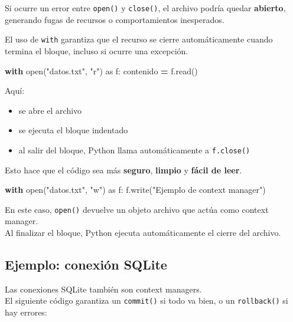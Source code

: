 \documentclass[
]{book}
\newenvironment{Shaded}{\begin{snugshade}}{\end{snugshade}}
\newcommand{\BuiltInTok}[1]{#1}
\newcommand{\ControlFlowTok}[1]{\textcolor[rgb]{0.13,0.29,0.53}{\textbf{#1}}}
\newcommand{\ImportTok}[1]{#1}
\newcommand{\NormalTok}[1]{#1}
\newcommand{\OperatorTok}[1]{\textcolor[rgb]{0.81,0.36,0.00}{\textbf{#1}}}
\newcommand{\StringTok}[1]{\textcolor[rgb]{0.31,0.60,0.02}{#1}}
\providecommand{\tightlist}{%
  \setlength{\itemsep}{0pt}\setlength{\parskip}{0pt}}
\theoremstyle{break}
\theoremstyle{nonumberplain}
\begin{document}
Si ocurre un error entre \texttt{open()} y \texttt{close()}, el archivo podría quedar \textbf{abierto}, generando fugas de recursos o comportamientos inesperados.

El uso de \texttt{with} garantiza que el recurso se cierre automáticamente cuando termina el bloque, incluso si ocurre una excepción.

\begin{Shaded}
\begin{Highlighting}[]
\ControlFlowTok{with} \BuiltInTok{open}\NormalTok{(}\StringTok{"datos.txt"}\NormalTok{, }\StringTok{"r"}\NormalTok{) }\ImportTok{as}\NormalTok{ f:}
\NormalTok{    contenido }\OperatorTok{=}\NormalTok{ f.read()}
\end{Highlighting}
\end{Shaded}

Aquí:

\begin{itemize}
\tightlist
\item
  se abre el archivo
\item
  se ejecuta el bloque indentado
\item
  al salir del bloque, Python llama automáticamente a \texttt{f.close()}
\end{itemize}

Esto hace que el código sea más \textbf{seguro}, \textbf{limpio} y \textbf{fácil de leer}.

\begin{Shaded}
\begin{Highlighting}[]
\ControlFlowTok{with} \BuiltInTok{open}\NormalTok{(}\StringTok{"datos.txt"}\NormalTok{, }\StringTok{"w"}\NormalTok{) }\ImportTok{as}\NormalTok{ f:}
\NormalTok{    f.write(}\StringTok{"Ejemplo de context manager"}\NormalTok{)}
\end{Highlighting}
\end{Shaded}

En este caso, \texttt{open()} devuelve un objeto archivo que actúa como context manager.\\
Al finalizar el bloque, Python ejecuta automáticamente el cierre del archivo.

\subsection{Ejemplo: conexión SQLite}\label{ejemplo-conexiuxf3n-sqlite}

Las conexiones SQLite también son context managers.\\
El siguiente código garantiza un \texttt{commit()} si todo va bien, o un \texttt{rollback()} si hay errores:
\end{document}
